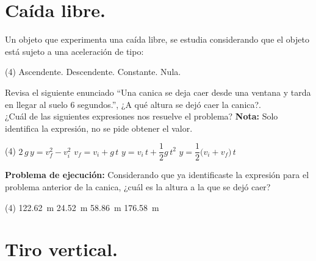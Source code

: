 \documentclass[12pt, letter]{exam}
\begin{document}
\begin{questions}
    \section{Caída libre.}
    
    \question Un objeto que experimenta una caída libre, se estudia considerando que el objeto está sujeto a una aceleración de tipo:
    \begin{tasks}(4)
        \task Ascendente.
        \task Descendente.
        \task Constante.
        \task Nula.
    \end{tasks}
    \question Revisa el siguiente enunciado \enquote{Una canica se deja caer desde una ventana y tarda en llegar al suelo \num{6} segundos.}, ¿A qué altura se dejó caer la canica?. 
    \\
    ¿Cuál de las siguientes expresiones nos resuelve el problema? \textbf{Nota: } Solo identifica la expresión, no se pide obtener el valor.
    \begin{tasks}(4)
        \task $2 \, g \, y = v_{f}^{2} - v_{i}^{2}$
        \task $v_{f} = v_{i} + g \, t$
        \task $y = v_{i} \, t + \dfrac{1}{2} g \, t^{2}$
        \task $y = \dfrac{1}{2} \big( v_{i} + v_{f} \big) \, t$
    \end{tasks}
    \question \label{Problema_02} \textbf{Problema de ejecución:} Considerando que ya identificaste la expresión para el problema anterior de la canica, ¿cuál es la altura a la que se dejó caer?
    \begin{tasks}(4)
        \task \SI{122.62}{\meter}
        \task \SI{24.52}{\meter}
        \task \SI{58.86}{\meter}
        \task \SI{176.58}{\meter}
    \end{tasks}
    
    \newpage

    \section{Tiro vertical.}


\end{questions}
\end{document}
